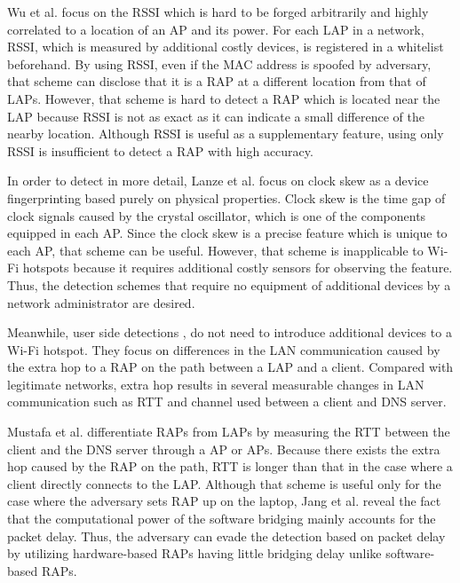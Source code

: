 \documentclass[conference]{IEEEtran}
\begin{document}
Wu et al. \cite{prapd} focus on the RSSI which is hard to be forged arbitrarily and highly correlated to a location of an AP and its power.
For each LAP in a network, RSSI, which is measured by additional costly devices, is registered in a whitelist beforehand.
By using RSSI, even if the MAC address is spoofed by adversary, that scheme can disclose that it is a RAP at a different location from that of LAPs.
However, that scheme is hard to detect a RAP which is located near the LAP because RSSI is not as exact as it can indicate a small difference of the nearby location.
Although RSSI is useful as a supplementary feature, using only RSSI is insufficient to detect a RAP with high accuracy.

In order to detect in more detail, Lanze et al. \cite{clockskew} focus on clock skew as a device fingerprinting based purely on physical properties.
Clock skew is the time gap of clock signals caused by the crystal oscillator, which is one of the components equipped in each AP.
Since the clock skew is a precise feature which is unique to each AP, that scheme can be useful.
However, that scheme is inapplicable to Wi-Fi hotspots because it requires additional costly sensors for observing the feature.
Thus, the detection schemes that require no equipment of additional devices by a network administrator are desired.

Meanwhile, user side detections \cite{rtt}, \cite{previous} do not need to introduce additional devices to a Wi-Fi hotspot.
They focus on differences in the LAN communication caused by the extra hop to a RAP on the path between a LAP and a client.
Compared with legitimate networks, extra hop results in several measurable changes in LAN communication such as RTT and channel used between a client and DNS server.

Mustafa et al. \cite{rtt} differentiate RAPs from LAPs by measuring the RTT between the client and the DNS server through a AP or APs.
Because there exists the extra hop caused by the RAP on the path, RTT is longer than that in the case where a client directly connects to the LAP.
Although that scheme is useful only for the case where the adversary sets RAP up on the laptop, Jang et al. \cite{previous} reveal the fact that the computational power of the software bridging mainly accounts for the packet delay.
Thus, the adversary can evade the detection based on packet delay by utilizing hardware-based RAPs having little bridging delay unlike software-based RAPs.
\end{document}
